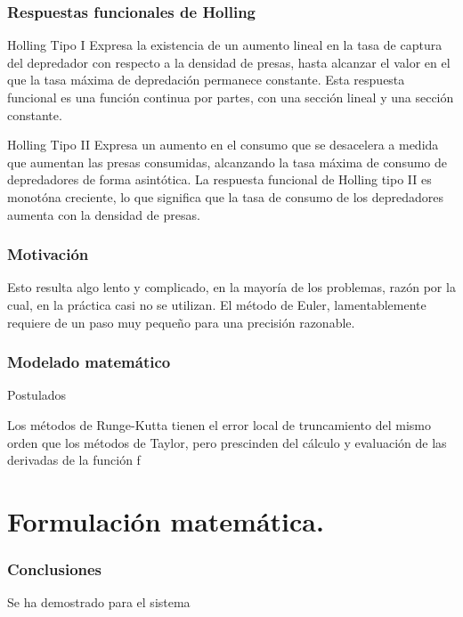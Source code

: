\documentclass{beamer}
\begin{document}
\begin{frame}
	\frametitle{Respuestas funcionales de Holling}
	\begin{block}{Holling Tipo I}
		Expresa la existencia de un aumento lineal en la tasa de captura del depredador con respecto a la densidad de presas, hasta alcanzar el valor en 
		el que la tasa máxima de depredación permanece constante. Esta respuesta funcional es una función continua por partes, con una sección lineal y una sección constante.
	\end{block}

	\begin{block}{Holling Tipo II}
		 Expresa un aumento en el consumo que se desacelera a medida que aumentan las presas consumidas, alcanzando la tasa máxima de consumo de 
		depredadores de forma asintótica. La respuesta funcional de Holling tipo II es monotóna creciente, lo que significa que la tasa de consumo 
		de los depredadores aumenta con la densidad de presas.
	\end{block}
\end{frame}



\begin{frame}
\frametitle{Motivaci\'on}
\begin{minipage}{10cm}
Esto resulta algo lento y complicado, en la mayor\'ia de los problemas, raz\'on por la cual, en la pr\'actica casi no se utilizan. El m\'etodo de Euler, lamentablemente requiere de un paso muy pequeño para una precisi\'on razonable. 
\end{minipage}
\end{frame}	

\begin{frame}
	\frametitle{Modelado matem\'atico }
\begin{alertblock}{\begin{dinglist}{45}
			\item Postulados
	\end{dinglist}}
    \begin{minipage}{10cm}
	Los m\'etodos de Runge-Kutta tienen el error local de truncamiento del mismo orden que los m\'etodos de Taylor, pero prescinden del c\'alculo y evaluaci\'on de las derivadas de la funci\'on f
     \end{minipage}
\end{alertblock}
\end{frame}

\section{Formulaci\'on matem\'atica.}
\begin{frame}
	\frametitle{Conclusiones}
	\begin{minipage}{10cm}
	Se ha demostrado para el sistema 
	\end{minipage}
\end{frame}
\end{document}
